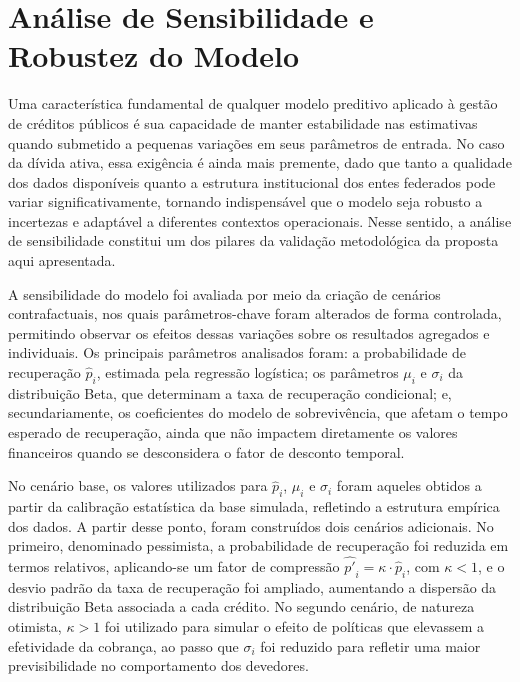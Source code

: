 \documentclass[a4paper,12pt]{article}
\begin{document}
\section{Análise de Sensibilidade e Robustez do Modelo}
Uma característica fundamental de qualquer modelo preditivo aplicado à gestão de créditos públicos é sua capacidade de manter estabilidade nas estimativas quando submetido a pequenas variações em seus parâmetros de entrada. No caso da dívida ativa, essa exigência é ainda mais premente, dado que tanto a qualidade dos dados disponíveis quanto a estrutura institucional dos entes federados pode variar significativamente, tornando indispensável que o modelo seja robusto a incertezas e adaptável a diferentes contextos operacionais. Nesse sentido, a análise de sensibilidade constitui um dos pilares da validação metodológica da proposta aqui apresentada.

A sensibilidade do modelo foi avaliada por meio da criação de cenários contrafactuais, nos quais parâmetros-chave foram alterados de forma controlada, permitindo observar os efeitos dessas variações sobre os resultados agregados e individuais. Os principais parâmetros analisados foram: a probabilidade de recuperação 
 $\hat{p}_{i}$, estimada pela regressão logística; os parâmetros $\mu_{i}$ e $\sigma_{i}$ da distribuição Beta, que determinam a taxa de recuperação condicional; e, secundariamente, os coeficientes do modelo de sobrevivência, que afetam o tempo esperado de recuperação, ainda que não impactem diretamente os valores financeiros quando se desconsidera o fator de desconto temporal.

No cenário base, os valores utilizados para $\hat{p}_{i}$, $\mu_{i}$ e $\sigma_{i}$ foram aqueles obtidos a partir da calibração estatística da base simulada, refletindo a estrutura empírica dos dados. A partir desse ponto, foram construídos dois cenários adicionais. No primeiro, denominado pessimista, a probabilidade de recuperação foi reduzida em termos relativos, aplicando-se um fator de compressão $\hat{p'}_{i} = \kappa \cdot \hat{p}_{i}$, com $\kappa < 1$, e o desvio padrão da taxa de recuperação foi ampliado, aumentando a dispersão da distribuição Beta associada a cada crédito. No segundo cenário, de natureza otimista, $\kappa > 1$ foi utilizado para simular o efeito de políticas que elevassem a efetividade da cobrança, ao passo que $\sigma_{i}$ foi reduzido para refletir uma maior previsibilidade no comportamento dos devedores.
\end{document}
